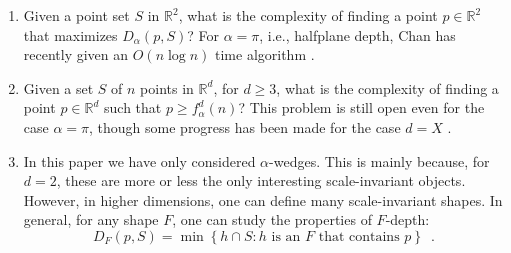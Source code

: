 \documentclass[lotsofwhite]{patmorin}
\begin{document}
\begin{enumerate}
\item Given a point set $S$ in $\mathbb{R}^2$, what is the complexity
of finding a point $p\in\mathbb{R}^2$ that maximizes $D_\alpha(p,S)$?
For $\alpha=\pi$, i.e., halfplane depth, Chan has recently given an
$O(n\log n)$ time algorithm \cite{c04}.

\item Given a set $S$ of $n$ points in $\mathbb{R}^d$, for $d\ge 3$,
what is the complexity of finding a point $p\in \mathbb{R}^d$ such
that $p\ge f_\alpha^d(n)$?  This problem is still open even for the
case $\alpha=\pi$, though some progress has been made for the case
$d=X$ \cite{X}.

\item In this paper we have only considered $\alpha$-wedges.  This is
mainly because, for $d=2$, these are more or less the only interesting
scale-invariant objects.  However, in higher dimensions, one can
define many scale-invariant shapes.  In general, for any shape $F$,
one can study the properties of $F$-depth:
\[
  D_F(p,S) = \min\left\{ 
     h\cap S : \mbox{$h$ is an $F$ that contains $p$}
  \right\} \enspace .
\] 
\end{enumerate}





\end{document}
